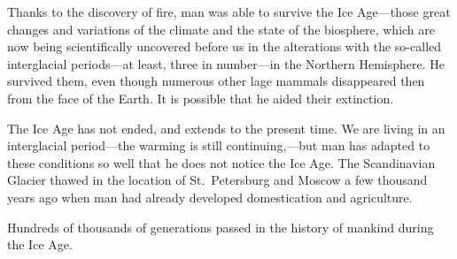 Thanks to the discovery of fire, man was able to survive the Ice Age---those
great changes and variations of the climate and the state of the biosphere,
which are now being scientifically uncovered before us in the alterations with
the so-called interglacial periods---at least, three in number---in the
Northern Hemisphere.  He survived them, even though numerous other lage mammals
disappeared then from the face of the Earth.  It is possible that he aided
their extinction.

The Ice Age has not ended, and extends to the present time.  We are living in
an interglacial period---the warming is still continuing,---but man has adapted
to these conditions so well that he does not notice the Ice Age.  The
Scandinavian Glacier thawed in the location of St.\ Petersburg and Moscow a few
thousand years ago when man had already developed domestication and
agriculture.

Hundreds of thousands of generations passed in the history of mankind during
the Ice Age.

